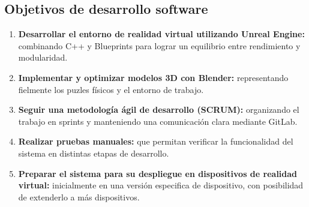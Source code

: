 \subsection{Objetivos de desarrollo software}
\label{Objetivos de desarrollo}
\begin{enumerate}
    \item \textbf{Desarrollar el entorno de realidad virtual utilizando Unreal Engine:} combinando C++ y Blueprints para lograr un equilibrio entre rendimiento y modularidad.
    
    \item \textbf{Implementar y optimizar modelos 3D con Blender:} representando fielmente los puzles físicos y el entorno de trabajo.
    
    \item \textbf{Seguir una metodología ágil de desarrollo (SCRUM):} organizando el trabajo en sprints y manteniendo una comunicación clara mediante GitLab.
    
    \item \textbf{Realizar pruebas manuales:} que permitan verificar la funcionalidad del sistema en distintas etapas de desarrollo.
    
    \item \textbf{Preparar el sistema para su despliegue en dispositivos de realidad virtual:} inicialmente en una versión especifica de dispositivo, con posibilidad de extenderlo a más dispositivos.
\end{enumerate}